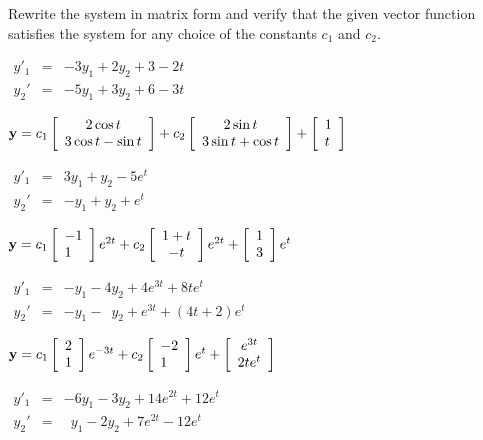 \begin{exerciselist}
  \item\label{exer:10.2.5} Rewrite the system in matrix form and verify that the given vector
        function satisfies the system for any choice of the constants $c_{1}$ and $c_{2}$.

  \begin{alist}
    \item %
    $\begin{array}{ccc}
      y'_{1} & = & -3y_{1}+2y_{2}+3-2t \\
      y_{2}' & = & -5y_{1}+3y_{2}+6-3t
    \end{array}$

    ${\bf y}=c_{1}\left[
    \begin{array}{c}
      2\cos t        \\
      3\cos t-\sin t
    \end{array}\right]+c_{2}\left[
    \begin{array}{c}
      2\sin t        \\
      3\sin t+\cos t
    \end{array}\right]+\left[\begin{array}{l}1\\t\end{array}\right]$

    \item %
    $\begin{array}{ccc}
      y'_{1} & = & 3y_{1}+y_{2}-5e^{t} \\
      y_{2}' & = & -y_{1}+y_{2}+e^{t}
    \end{array}$

    ${\bf y}=c_{1}\left[\begin{array}{l}-1\\1\end{array}\right]e^{2t}+c_{2}\left[
    \begin{array}{c}
      1+t \\
      -t
    \end{array}
    \right]e^{2t}+\left[\begin{array}{l}1\\3\end{array}\right]e^{t}$

    \item %
    $\begin{array}{ccl}
      y'_{1} & = & -y_{1}-4y_{2}+4e^{3t}+8te^{t}               \\
      y_{2}' & = & -y_{1}-\phantom{4}y_{2}+e^{3t}+(4t+2)e^{t}
    \end{array}$

    ${\bf y}=c_{1}\left[\begin{array}{l}2\\1\end{array}\right]e^{-3t}+c_{2}\left[\begin{array}{l}-2\\1\end{array}\right]e^{t}+\left[
    \begin{array}{c}
      e^{3t}  \\
      2te^{t}
    \end{array}\right]$

    \item %
    $\begin{array}{ccc}
      y'_{1} & = & -6y_{1}-3y_{2}+14e^{2t}+12e^{t}         \\
      y_{2}' & = & \phantom{6}y_{1}-2y_{2}+7e^{2t}-12e^{t}
    \end{array}$


\end{alist}
\end{exerciselist}
